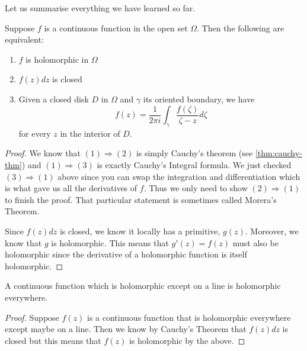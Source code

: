 Let us summarise everything we have learned so far.
\begin{proposition}
Suppose $f$ is a continuous function in the open set $\Omega$. Then the following are equivalent:
\begin{enumerate}
    \item $f$ is holomorphic in $\Omega$
    \item $f(z) dz$ is closed
    \item Given a closed disk $D$ in $\Omega$ and $\gamma$ its oriented boundary, we have
    $$ f(z) = \frac{1}{2\pi i} \int_{\gamma} \frac{f(\zeta)}{\zeta - z} d\zeta $$
    for every $z$ in the interior of $D$.
\end{enumerate}
\end{proposition}
\begin{proof}
    We know that $(1) \Rightarrow (2)$ is simply Cauchy's theorem (see \autoref{thm:cauchy-thm}) and $(1) \Rightarrow (3)$ is exactly Cauchy's Integral formula. We just checked $(3) \Rightarrow (1)$ above since you can swap the integration and differentiation which is what gave us all the derivatives of $f$. Thus we only need to show $(2) \Rightarrow (1)$ to finish the proof. That particular statement is sometimes called Morera's Theorem.
    
    Since $f(z) dz$ is closed, we know it locally has a primitive, $g(z)$. Moreover, we know that $g$ is holomorphic. This means that $g'(z) = f(z)$ must also be holomorphic since the derivative of a holomorphic function is itself holomorphic.
    
\end{proof}
\begin{corollary}
    A continuous function which is holomorphic except on a line is holomorphic everywhere.
\end{corollary}
\begin{proof}
    Suppose $f(z)$ is a continuous function that is holomorphic everywhere except maybe on a line. Then we know by Cauchy's Theorem that $f(z)dz$ is closed but this means that $f(z)$ is holomorphic by the above.
\end{proof}

